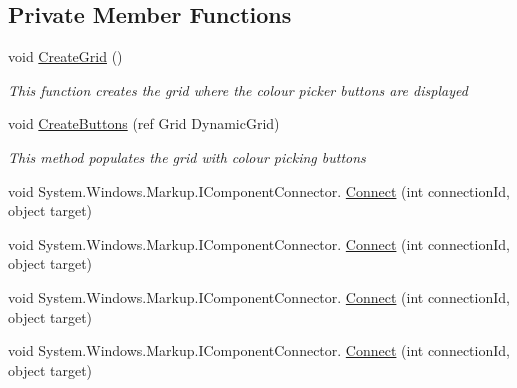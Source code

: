\subsection*{Private Member Functions}
\begin{DoxyCompactItemize}
\item 
void \hyperlink{class_c_p_u___o_s___simulator_1_1_colour_picker_window_aed4e40744fb046fb84cebd2c406b8a99}{Create\+Grid} ()
\begin{DoxyCompactList}\small\item\em This function creates the grid where the colour picker buttons are displayed \end{DoxyCompactList}\item 
void \hyperlink{class_c_p_u___o_s___simulator_1_1_colour_picker_window_a2969d055fb398db5c470dd91d89abffd}{Create\+Buttons} (ref Grid Dynamic\+Grid)
\begin{DoxyCompactList}\small\item\em This method populates the grid with colour picking buttons \end{DoxyCompactList}\item 
void System.\+Windows.\+Markup.\+I\+Component\+Connector. \hyperlink{class_c_p_u___o_s___simulator_1_1_colour_picker_window_a857b5ab5ebf06a29846e0595c3c442ad}{Connect} (int connection\+Id, object target)
\item 
void System.\+Windows.\+Markup.\+I\+Component\+Connector. \hyperlink{class_c_p_u___o_s___simulator_1_1_colour_picker_window_a857b5ab5ebf06a29846e0595c3c442ad}{Connect} (int connection\+Id, object target)
\item 
void System.\+Windows.\+Markup.\+I\+Component\+Connector. \hyperlink{class_c_p_u___o_s___simulator_1_1_colour_picker_window_a857b5ab5ebf06a29846e0595c3c442ad}{Connect} (int connection\+Id, object target)
\item 
void System.\+Windows.\+Markup.\+I\+Component\+Connector. \hyperlink{class_c_p_u___o_s___simulator_1_1_colour_picker_window_a857b5ab5ebf06a29846e0595c3c442ad}{Connect} (int connection\+Id, object target)
\end{DoxyCompactItemize}
